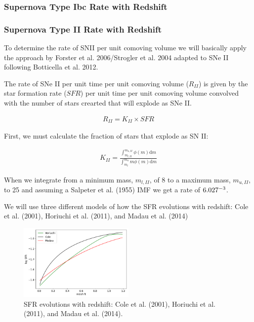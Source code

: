 \documentclass[12pt, onecolumn]{emulateapj}
\begin{document}
\subsubsection{Supernova Type Ibc Rate with Redshift}
\label{sec:TypeIbcRate}

\subsubsection{Supernova Type II Rate with Redshift}
\label{sec:TypeIIRate}

To determine the rate of SNII per unit comoving volume we will basically apply the approach by Forster et al. 2006/Strogler et al. 2004 adapted to SNe II following Botticella et al. 2012.

The rate of SNe II per unit time per unit comoving volume ($R_{II}$) is given by the star formation rate ($SFR$) per unit time per unit comoving volume convolved with the number of stars crearted that will explode as SNe II.

\begin{align}
	\label{eq:rateII_1}
	R_{II} = K_{II} \times SFR
\end{align}

First, we must calculate the fraction of stars that explode as SN II:

\begin{align}
\label{eq:rateII_2}
K_{II} = \frac{\int_{m_{l,II}}^{m_{u,II}} \phi(m) \mathrm{d}m}{\int_{m_{l}}^{m_{u}} m\phi(m) \mathrm{d}m}
\end{align}

When we integrate from a minimum mass, $m_{l,II}$, of 8 to a maximum mass, $m_{u,II}$, to 25 and assuming a Salpeter et al. (1955) IMF we get a rate of $6.027 \time 10^{-3}$.

We will use three different models of how the SFR evolutions with redshift: Cole et al. (2001), Horiuchi et al. (2011), and Madau et al. (2014)

\begin{figure}
	\begin{center}
		\includegraphics[width=0.5\textwidth]{fig/SNII_SFR.png}
		\caption{SFR evolutions with redshift: Cole et al. (2001), Horiuchi et al. (2011), and Madau et al. (2014).}
		\label{fig:SNII_SFR}
	\end{center}
\end{figure}
\end{document}
